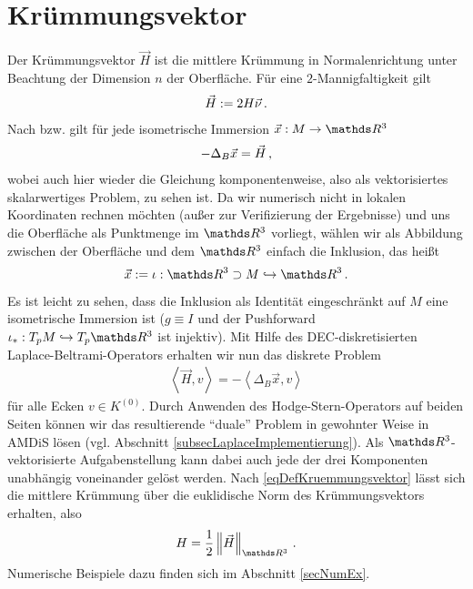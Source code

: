 \section{Krümmungsvektor}
  \label{secKruemmungsvektor}
  Der Krümmungsvektor \( \vec{H} \) ist die mittlere Krümmung in Normalenrichtung unter Beachtung der Dimension \( n \) der Oberfläche.
  Für eine \( 2 \)-Mannigfaltigkeit gilt
  \begin{align}
    \label{eqDefKruemmungsvektor}
    \vec{H} := 2 H \vec{\nu} \,\text{.}
  \end{align}
  Nach \cite[4.5]{chen} bzw. \cite[4.5]{flanders} gilt für jede isometrische Immersion \( \vec{x}:M\rightarrow \R^{3} \)
  \begin{align}
    -\Delta_{B}\vec{x} = \vec{H} \,\text{,}
  \end{align}
  wobei auch hier wieder die Gleichung komponentenweise, also als vektorisiertes skalarwertiges Problem, zu sehen ist.
  Da wir numerisch nicht in lokalen Koordinaten rechnen möchten (außer zur Verifizierung der Ergebnisse) und uns die Oberfläche als
  Punktmenge im \( \R^{3} \) vorliegt, wählen wir als Abbildung zwischen der Oberfläche und dem \( \R^{3} \) einfach die Inklusion, das heißt
  \begin{align}
    \vec{x}:= \iota: \R^{3}\supset M \hookrightarrow \R^{3} \formpunkt
  \end{align}
  Es ist leicht zu sehen, dass die Inklusion als Identität eingeschränkt auf \( M \) eine isometrische Immersion ist 
  (\( g\equiv I \) und der Pushforward \( \iota_{*}:T_{p}M \hookrightarrow T_{p}\R^{3} \) ist injektiv).
  Mit Hilfe des DEC-diskretisierten Laplace-Beltrami-Operators erhalten wir nun das diskrete Problem
  \begin{align}
    \label{eqProbLX}
    \left\langle \vec{H}, v \right\rangle = - \left\langle \Delta_{B}\vec{x} , v \right\rangle
  \end{align}
  für alle Ecken \( v\in K^{(0)} \).
  Durch Anwenden des Hodge-Stern-Operators auf beiden Seiten können wir das resultierende "`duale"' Problem in gewohnter Weise in AMDiS
  lösen (vgl. Abschnitt \ref{subsecLaplaceImplementierung}).
  Als \( \R^{3} \)-vektorisierte Aufgabenstellung kann dabei auch jede der drei Komponenten unabhängig voneinander gelöst werden.
  Nach \eqref{eqDefKruemmungsvektor} lässt sich die mittlere Krümmung über die euklidische Norm des Krümmungsvektors erhalten, also
  \begin{align}
    H = \frac{1}{2}\left\| \vec{H} \right\|_{\R^{3}} \formpunkt
  \end{align}
  Numerische Beispiele dazu finden sich im Abschnitt \ref{secNumEx}.

